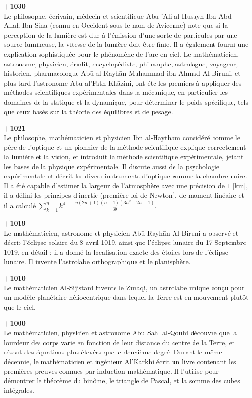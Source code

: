 \textbf{+1030}\\
Le philosophe, écrivain, médecin et scientifique Abu 'Ali al-Husayn Ibn Abd Allah Ibn Sina (connu en Occident sous le nom de Avicenne) note que si la perception de la lumière est due à l'émission d'une sorte de particules par une source lumineuse, la vitesse de la lumière doit être finie. Il a également fourni une explication sophistiquée pour le phénomène de l'arc en ciel.  Le mathématicien, astronome, physicien, érudit, encyclopédiste, philosophe, astrologue, voyageur, historien, pharmacologue Abū al-Rayhān Muhammad ibn Ahmad  Al-Biruni, et plus tard l'astronome Abu al'Fath Khāzini, ont été les premiers à appliquer des méthodes scientifiques expérimentales dans la mécanique, en particulier les domaines de la statique et la dynamique, pour déterminer le poids spécifique, tels que ceux basés sur la théorie des équilibres et de pesage.

\textbf{+1021}\\
Le philosophe, mathématicien et physicien Ibn al-Haytham considéré comme le père de l'optique et un pionnier de la méthode scientifique explique correctement la lumière et la vision, et introduit la méthode scientifique expérimentale, jetant les bases de la physique expérimentale. Il discute aussi de la psychologie expérimentale et décrit les divers instruments d'optique comme la chambre noire. Il a été capable d'estimer la largeur de l'atmosphère avec une précision de $1$ [km], il a défini les principes d'inertie (première loi de Newton), de moment linéaire et il a calculé $\sum_ {k = 1}^n k^4=\frac{n(2n+1)(n+1)(3n^2+2n-1)}{30}$.

\textbf{+1019}\\
Le mathématicien, astronome et physicien Abū Rayhān Al-Biruni a observé et décrit l'éclipse solaire du 8 avril 1019, ainsi que l'éclipse lunaire du 17 Septembre 1019, en détail ; il a donné la localisation exacte des étoiles lors de l'éclipse lunaire. Il invente l'astrolabe orthographique et le planisphère.

\textbf{+1010}\\
Le mathématicien Al-Sijistani invente le Zuraqi, un astrolabe unique conçu pour un modèle planétaire héliocentrique dans lequel la Terre est en mouvement plutôt que le ciel.

\textbf{+1000}\\
Le mathématicien, physicien et astronome Abu Sahl al-Qouhi découvre que la lourdeur des corps varie en fonction de leur distance du centre de la Terre, et résout des équations plus élevées que le deuxième degré. Durant le même décennie, le mathématicien et ingénieur Al'Karkhi écrit un livre contenant les premières preuves connues par induction mathématique. Il l'utilise pour démontrer le théorème du binôme, le triangle de Pascal, et la somme des cubes intégrales.

